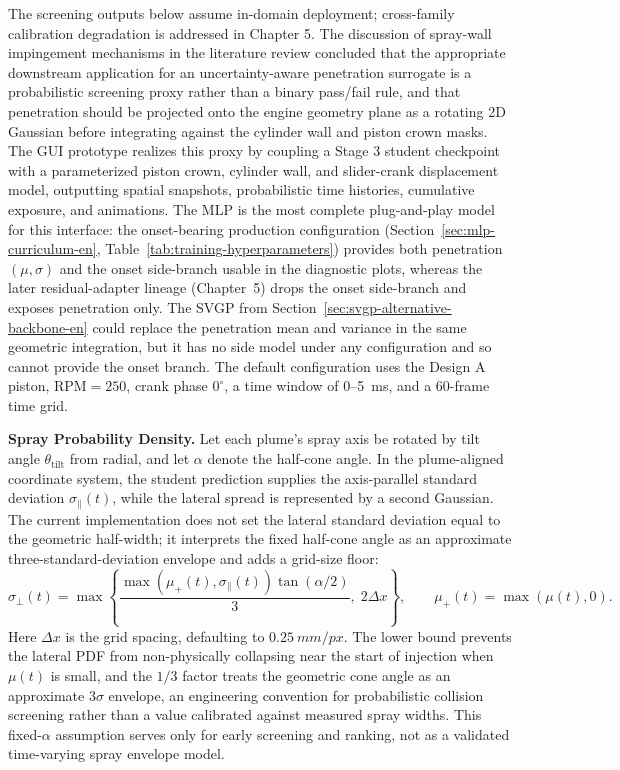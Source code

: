 The screening outputs below assume in-domain deployment; cross-family calibration degradation is addressed in Chapter 5. The discussion of spray-wall impingement mechanisms in the literature review concluded that the appropriate downstream application for an uncertainty-aware penetration surrogate is a probabilistic screening proxy rather than a binary pass/fail rule, and that penetration should be projected onto the engine geometry plane as a rotating 2D Gaussian before integrating against the cylinder wall and piston crown masks. The GUI prototype realizes this proxy by coupling a Stage 3 student checkpoint with a parameterized piston crown, cylinder wall, and slider-crank displacement model, outputting spatial snapshots, probabilistic time histories, cumulative exposure, and animations. The MLP is the most complete plug-and-play model for this interface: the onset-bearing production configuration (Section~\ref{sec:mlp-curriculum-en}, Table~\ref{tab:training-hyperparameters}) provides both penetration \((\mu,\sigma)\) and the onset side-branch usable in the diagnostic plots, whereas the later residual-adapter lineage (Chapter~5) drops the onset side-branch and exposes penetration only. The SVGP from Section~\ref{sec:svgp-alternative-backbone-en} could replace the penetration mean and variance in the same geometric integration, but it has no side model under any configuration and so cannot provide the onset branch. The default configuration uses the Design A piston, \(\mathrm{RPM}=250\), crank phase \(0^{\circ}\), a time window of 0--\SI{5}{ms}, and a 60-frame time grid.

\textbf{Spray Probability Density.} Let each plume's spray axis be rotated by tilt angle \(\theta_{\mathrm{tilt}}\) from radial, and let \(\alpha\) denote the half-cone angle. In the plume-aligned coordinate system, the student prediction supplies the axis-parallel standard deviation \(\sigma_{\parallel}(t)\), while the lateral spread is represented by a second Gaussian. The current implementation does not set the lateral standard deviation equal to the geometric half-width; it interprets the fixed half-cone angle as an approximate three-standard-deviation envelope and adds a grid-size floor:
\[
\sigma_{\perp}(t)
=\max\!\left\{
\frac{\max\!\left(\mu_{+}(t),\sigma_{\parallel}(t)\right)\tan(\alpha/2)}{3},
\;2\Delta x
\right\},\qquad
\mu_{+}(t)=\max(\mu(t),0).
\]
Here $\Delta x$ is the grid spacing, defaulting to \(\SI{0.25}{mm/px}\). The lower bound prevents the lateral PDF from non-physically collapsing near the start of injection when \(\mu(t)\) is small, and the \(1/3\) factor treats the geometric cone angle as an approximate \(3\sigma\) envelope, an engineering convention for probabilistic collision screening rather than a value calibrated against measured spray widths. This fixed-\(\alpha\) assumption serves only for early screening and ranking, not as a validated time-varying spray envelope model.

